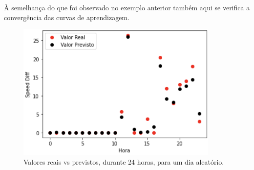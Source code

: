 \documentclass[a4paper, 12pt]{article}
\begin{document}
À semelhança do que foi observado no exemplo anterior também aqui se verifica a convergência das curvas de aprendizagem.

\begin{figure}[H]
	\centering
	\includegraphics[width=10cm]{resultados/real_prev_3.png}
	\caption{Valores reais vs previstos, durante 24 horas, para um dia aleatório.}
\end{figure}
\end{document}
